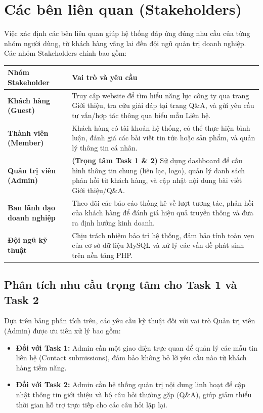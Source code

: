 \newpage
\section{Các bên liên quan (Stakeholders)}

Việc xác định các bên liên quan giúp hệ thống đáp ứng đúng nhu cầu của từng nhóm người dùng, từ khách hàng vãng lai đến đội ngũ quản trị doanh nghiệp. Các nhóm Stakeholders chính bao gồm:

\begin{center}
\begin{table}[H]
\centering
\renewcommand{\arraystretch}{1.5}
\begin{tabular}{|p{4.5cm}|p{10cm}|}
\hline
\textbf{Nhóm Stakeholder} & \textbf{Vai trò và yêu cầu} \\
\hline
\textbf{Khách hàng (Guest)} & Truy cập website để tìm hiểu năng lực công ty qua trang Giới thiệu, tra cứu giải đáp tại trang Q\&A, và gửi yêu cầu tư vấn/hợp tác thông qua biểu mẫu Liên hệ. \\
\hline
\textbf{Thành viên (Member)} & Khách hàng có tài khoản hệ thống, có thể thực hiện bình luận, đánh giá các bài viết tin tức hoặc sản phẩm, và quản lý thông tin cá nhân. \\
\hline
\textbf{Quản trị viên (Admin)} & \textbf{(Trọng tâm Task 1 \& 2)} Sử dụng dashboard để cấu hình thông tin chung (liên lạc, logo), quản lý danh sách phản hồi từ khách hàng, và cập nhật nội dung bài viết Giới thiệu/Q\&A. \\
\hline
\textbf{Ban lãnh đạo doanh nghiệp} & Theo dõi các báo cáo thống kê về lượt tương tác, phản hồi của khách hàng để đánh giá hiệu quả truyền thông và đưa ra định hướng kinh doanh. \\
\hline
\textbf{Đội ngũ kỹ thuật} & Chịu trách nhiệm bảo trì hệ thống, đảm bảo tính toàn vẹn của cơ sở dữ liệu MySQL và xử lý các vấn đề phát sinh trên nền tảng PHP. \\
\hline
\end{tabular}
\end{table}
\end{center}

\subsection{Phân tích nhu cầu trọng tâm cho Task 1 và Task 2}
Dựa trên bảng phân tích trên, các yêu cầu kỹ thuật đối với vai trò Quản trị viên (Admin) được ưu tiên xử lý bao gồm:
\begin{itemize}
    \item \textbf{Đối với Task 1:} Admin cần một giao diện trực quan để quản lý các mẫu tin liên hệ (Contact submissions), đảm bảo không bỏ lỡ yêu cầu nào từ khách hàng tiềm năng.
    \item \textbf{Đối với Task 2:} Admin cần hệ thống quản trị nội dung linh hoạt để cập nhật thông tin giới thiệu và bộ câu hỏi thường gặp (Q\&A), giúp giảm thiểu thời gian hỗ trợ trực tiếp cho các câu hỏi lặp lại.
\end{itemize}
